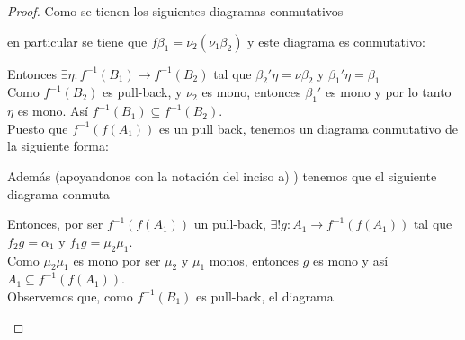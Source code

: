 \documentclass{article}
\begin{document}
\begin{enumerate}[label=\textbf{Ej \arabic*.}]
\begin{proof}
 Como se tienen los siguientes diagramas conmutativos\\

\centerline{
}

en particular se tiene que $f\beta_1=\nu_2(\nu_1\beta_2)$ y este diagrama es conmutativo:\\

\centerline{
}

Entonces $\exists \eta : f^{-1}(B_1)\to f^{-1}(B_2)$ tal que $\beta_2'\eta=\nu\beta_2$\,\,y\,\,$\beta_1'\eta=\beta_1$\\

Como $f^{-1}(B_2)$ es pull-back, y $\nu_2$ es mono, entonces $\beta_1'$ es mono y por lo tanto $\eta$ es mono. Así $f^{-1}(B_1)\subseteq f^{-1}(B_2)$.
\\

 Puesto que $f^{-1}(f(A_1))$ es un pull back, tenemos un diagrama conmutativo de la siguiente forma:\\

\centerline{
}

Además (apoyandonos con la notación del inciso a) ) tenemos que el siguiente diagrama conmuta

\centerline{
}

Entonces, por ser $f^{-1}(f(A_1))$ un pull-back, $\exists ! g:A_1\to f^{-1}(f(A_1))$ tal que $f_2g=\alpha_1$ y $f_1g=\mu_2\mu_1$.\\

Como $\mu_2\mu_1$ es mono por ser $\mu_2$ y $\mu_1$ monos, entonces $g$ es mono y así $A_1\subseteq f^{-1}(f(A_1))$.\\

 Observemos que, como $f^{-1}(B_1)$ es pull-back, el diagrama\\

\centerline{
}


\end{proof}
\end{enumerate}
\end{document}
